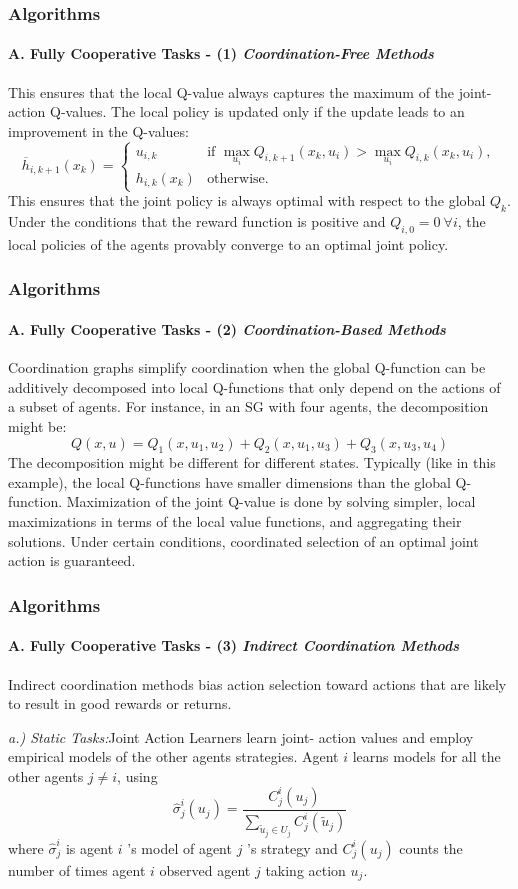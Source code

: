 \documentclass{beamer}
\begin{document}
\begin{frame}
\frametitle{Algorithms}
\framesubtitle{A. Fully Cooperative Tasks - (1) \textit{Coordination-Free Methods}}
This ensures that the local Q-value always captures
the
maximum
of
the
joint-action
Q-values.
The local policy is updated
only if the update leads to an improvement in the Q-values:
\begin{equation}
\overline{h}_{i,k+1}(x_k) = 
\begin{cases} 
u_{i,k} & \text{if } \max_{u_i} Q_{i,k+1}(x_k, u_i) > \max_{u_i} Q_{i,k}(x_k, u_i), \\
h_{i,k}(x_k) & \text{otherwise}.
\end{cases}
\end{equation}
This ensures that the joint policy is always
optimal with respect to the global $Q_k$. Under the conditions that the reward function is positive and $Q_{i,0} = 0\ \forall i$, the local
policies of the agents provably converge to an optimal joint
policy.
\end{frame}

\begin{frame}
\frametitle{Algorithms}
\framesubtitle{A. Fully Cooperative Tasks - (2) \textit{Coordination-Based Methods}}
Coordination graphs simplify coordination when the global Q-function can be additively decomposed into local Q-functions that only depend on the actions of a subset of agents. For instance, in an SG with four agents, the decomposition might be:
$$Q(x, u) = Q_1(x, u_1, u_2) + Q_2(x, u_1, u_3) + Q_3(x, u_3, u_4)$$
The decomposition might be different for different states. Typically (like in this example), the local Q-functions have smaller dimensions than the global Q-function. Maximization of the joint Q-value is done by solving simpler, local maximizations in terms of the local value functions, and aggregating their solutions. Under certain conditions, coordinated selection of an optimal joint action is guaranteed.
\end{frame}

\begin{frame}
\frametitle{Algorithms}
\framesubtitle{A. Fully Cooperative Tasks - (3) \textit{Indirect Coordination Methods}}
Indirect coordination
methods bias action selection toward actions that are likely to
result in good rewards or returns.\vspace{4pt}

\textit{a.) Static Tasks:}Joint Action Learners learn joint-
action values and employ empirical models of the other agents
strategies. Agent $i$ learns models for all the other agents
$j \neq i$, using
\begin{equation}
\hat{\sigma}^i_j(u_j) = \frac{C^i_j(u_j)}{\sum_{\widetilde{u}_j \in U_j} C^i_j(\widetilde{u}_j)}
\end{equation}
where $\hat{\sigma}_j^i$ is agent $i$ 's model of agent $j$ 's strategy and $C_j^i\left(u_j\right)$ counts the number of times agent $i$ observed agent $j$ taking action $u_j$.
\end{frame}
\end{document}
